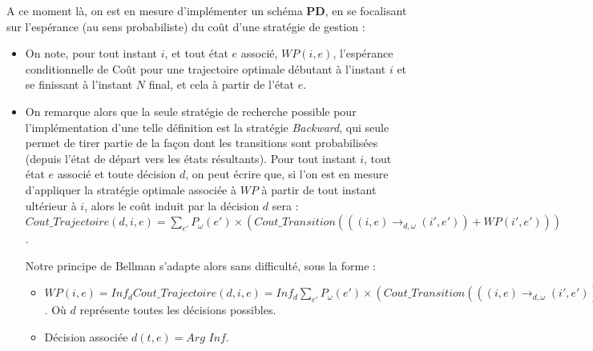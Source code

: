A ce moment là, on est en mesure d'implémenter un schéma \textbf{PD}, en se focalisant sur l'espérance (au sens probabiliste) du coût d'une stratégie de gestion : 
\begin{itemize}[label=$\square$]
	\item	On note, pour tout instant $i$, et tout état $e$ associé, $WP(i, e)$, l'espérance conditionnelle de Coût pour une trajectoire optimale débutant à l'instant $i$ et se finissant à l'instant $N$ final, et cela à partir de l'état $e$.  
	\item	On remarque alors que la seule stratégie de recherche possible pour l'implémentation d'une telle définition est la stratégie \textit{Backward}, qui seule permet de tirer partie de la façon dont les transitions sont probabilisées (depuis l'état de départ vers les états résultants).
	Pour tout instant $i$, tout état $e$ associé et toute décision  $d$, on peut écrire que, si l'on est en mesure d'appliquer la stratégie optimale associée à $WP$ à partir de tout instant ultérieur à $i$, alors le coût induit par la décision $d$ sera : $Cout\_Trajectoire(d, i, e) = \sum_{e'} P_\omega (e') \times (Cout\_Transition(((i, e) \rightarrow_{d,\omega} (i', e')) + WP(i', e'))) $. 
	
	Notre principe de Bellman s'adapte alors sans difficulté, sous la forme :
	
	\begin{itemize}[label=$\square$]
		
		\item	$WP(i, e) = Inf_{d}  Cout\_Trajectoire(d, i, e)  =  Inf_{d}   \sum_{e'} P_\omega (e') \times (Cout\_Transition(((i, e) \rightarrow_{d,\omega} (i', e')) + WP(i', e')))$. Où $d$ représente toutes les décisions possibles.
		\item	Décision associée $d(t, e) = Arg$ $Inf$.
	\end{itemize}
\end{itemize}

